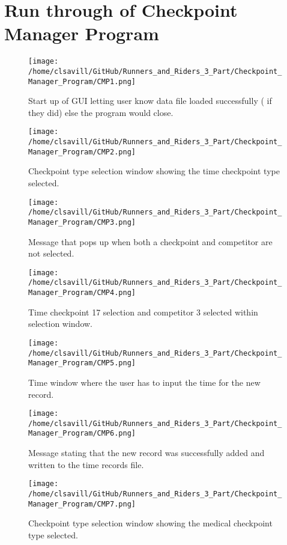\documentclass[a4paper,12pt]{article}
\begin{document}
\section{Run through of Checkpoint Manager Program}
\begin{figure}[H]
\texttt{[image: /home/clsavill/GitHub/Runners\_and\_Riders\_3\_Part/Checkpoint\_Manager\_Program/CMP1.png]}
\caption{Start up of GUI letting user know data file loaded successfully ( if they did) else the program would close.}
\end{figure}

\begin{figure}[H]
\texttt{[image: /home/clsavill/GitHub/Runners\_and\_Riders\_3\_Part/Checkpoint\_Manager\_Program/CMP2.png]}
\caption{Checkpoint type selection window showing the time checkpoint type selected.}
\end{figure}

\begin{figure}[H]
\texttt{[image: /home/clsavill/GitHub/Runners\_and\_Riders\_3\_Part/Checkpoint\_Manager\_Program/CMP3.png]}
\caption{Message that pops up when both a checkpoint and competitor are not selected.}
\end{figure}

\begin{figure}[H]
\texttt{[image: /home/clsavill/GitHub/Runners\_and\_Riders\_3\_Part/Checkpoint\_Manager\_Program/CMP4.png]}
\caption{Time checkpoint 17 selection and competitor 3 selected within selection window.}
\end{figure}

\begin{figure}[H]
\texttt{[image: /home/clsavill/GitHub/Runners\_and\_Riders\_3\_Part/Checkpoint\_Manager\_Program/CMP5.png]}
\caption{Time window where the user has to input the time for the new record.}
\end{figure}

\begin{figure}[H]
\texttt{[image: /home/clsavill/GitHub/Runners\_and\_Riders\_3\_Part/Checkpoint\_Manager\_Program/CMP6.png]}
\caption{Message stating that the new record was successfully added and written to the time records file.}
\end{figure}

\begin{figure}[H]
\texttt{[image: /home/clsavill/GitHub/Runners\_and\_Riders\_3\_Part/Checkpoint\_Manager\_Program/CMP7.png]}
\caption{Checkpoint type selection window showing the medical checkpoint type selected.}
\end{figure}
\end{document}
